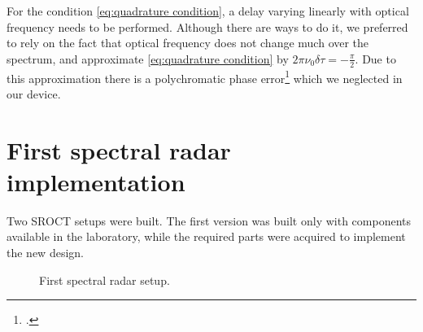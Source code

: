 \documentclass[12pt,twoside,english]{book}
\renewcommand{\~}{\perispomeni}%
\DeclareRobustCommand{\textgreek}[1]{\leavevmode{\greektext #1}}
\numberwithin{equation}{section}
\numberwithin{figure}{section}
\begin{document}
For the condition \ref{eq:quadrature condition}, a delay varying linearly with optical frequency needs to be performed. Although there are ways to do it, we preferred to rely on the fact that optical frequency does not change much over the spectrum, and approximate \ref{eq:quadrature condition} by $2\pi\nu_0\delta\tau=-\frac{\pi}{2}$. Due to this approximation there is a polychromatic phase error\footcite{Leitgeb:2003p1779} which we neglected in our device.



\section{First spectral radar implementation}
\label{section:Spectral radar implementation}

Two \gls{SROCT} setups were built. The first version was built only with components available in the laboratory, while the required parts were acquired to implement the new design.  


\begin{figure}[h]
\small

\caption{First spectral radar setup.}
\label{fig:SROCT setup 1}
\end{figure}
\end{document}
